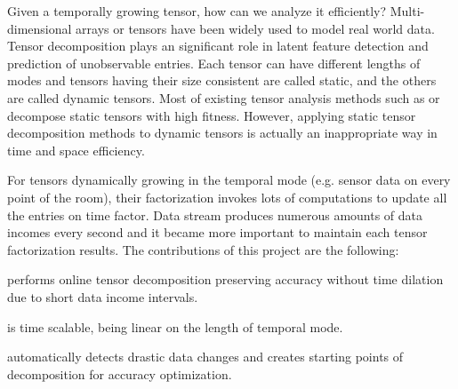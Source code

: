 
Given a temporally growing tensor, how can we analyze it efficiently? Multi-dimensional arrays or tensors have been widely used to model real world data. Tensor decomposition plays an significant role in latent feature detection and prediction of unobservable entries. Each tensor can have different lengths of modes and tensors having their size consistent are called static, and the others are called dynamic tensors. Most of existing tensor analysis methods such as \cpals or \hosvd decompose static tensors with high fitness. However, applying static tensor decomposition methods to dynamic tensors is actually an inappropriate way in time and space efficiency.

For tensors dynamically growing in the temporal mode (e.g. sensor data on every point of the room), their factorization invokes lots of computations to update all the entries on time factor. Data stream produces numerous amounts of data incomes every second and it became more important to maintain each tensor factorization results. The contributions of this project are the following:
\bit
\item \method performs online tensor decomposition preserving accuracy without time dilation due to short data income intervals.
\item \method is time scalable, being linear on the length of temporal mode. 
\item \method automatically detects drastic data changes and creates starting points of decomposition for accuracy optimization.
\eit